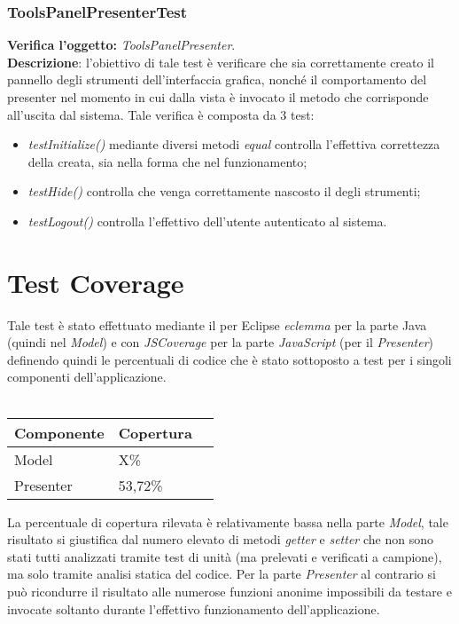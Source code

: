 \subsubsection{ToolsPanelPresenterTest}
\textbf{Verifica l'oggetto:} \textit{ToolsPanelPresenter}.\\
\textbf{Descrizione}: l'obiettivo di tale test è verificare che sia correttamente creato il pannello degli strumenti dell'interfaccia grafica, nonché il comportamento del presenter nel momento in cui dalla vista è invocato il metodo che corrisponde all'uscita dal sistema.
Tale verifica è composta da 3 test:
\begin{itemize}
\item \textit{testInitialize() } mediante diversi metodi \textit{equal} controlla l'effettiva correttezza della  creata, sia nella forma che nel funzionamento;
\item \textit{testHide() } controlla che venga correttamente nascosto il  degli strumenti;
\item \textit{testLogout() } controlla l'effettivo  dell'utente autenticato al sistema.
\end{itemize}
\clearpage

\section{Test Coverage}
Tale test è stato effettuato mediante il \underline{} per Eclipse \textit{eclemma} per la parte Java (quindi nel \textit{Model}) e con \textit{JSCoverage} per la parte \textit{JavaScript} (per il \textit{Presenter}) definendo quindi le percentuali di codice che è stato sottoposto a test per i singoli componenti dell'applicazione.\\\\

\begin{center}
\begin{longtable}{p{}ll}
\toprule Componente & Copertura\\
\midrule
Model & X\%\\
Presenter & 53,72\% \\
\bottomrule
\end{longtable}
\end{center}

La percentuale di copertura rilevata è relativamente bassa nella parte \textit{Model}, tale risultato si giustifica dal numero elevato di metodi \textit{getter} e \textit{setter} che non sono stati tutti analizzati tramite test di unità (ma prelevati e verificati a campione), ma solo tramite analisi statica del codice. Per la parte \textit{Presenter} al contrario si può ricondurre il risultato alle numerose funzioni anonime impossibili da testare e invocate soltanto durante l'effettivo funzionamento dell'applicazione.

